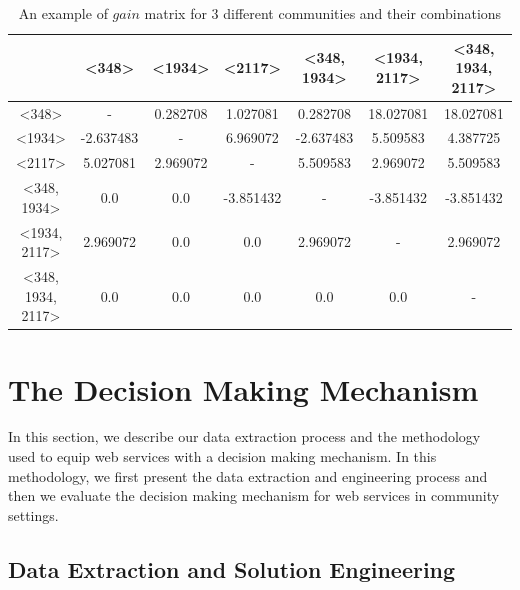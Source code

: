 \documentclass[10pt,journal,cspaper,compsoc]{IEEEtran}
\begin{document}
\begin{table}[ht]
\caption{An example of $gain$ matrix for 3 different communities and their combinations} %
\centering %
{\renewcommand{\arraystretch}{1.2}
\begin{tabular}{c|c c c c c c} %
\hline\hline %
 & \textless348\textgreater & \textless1934\textgreater & \textless2117\textgreater & \textless348, 1934\textgreater & \textless1934, 2117\textgreater & \textless348, 1934, 2117\textgreater \\ [0.5ex] %
\hline %
\textless348\textgreater & - & 0.282708 & 1.027081 & 0.282708 & 18.027081 & 18.027081 \\
\textless1934\textgreater & -2.637483 & - & 6.969072 & -2.637483 & 5.509583 & 4.387725 \\
\textless2117\textgreater & 5.027081 & 2.969072 & - & 5.509583 & 2.969072 & 5.509583 \\
\textless348, 1934\textgreater & 0.0 & 0.0 & -3.851432 & - & -3.851432 & -3.851432 \\
\textless1934, 2117\textgreater & 2.969072 & 0.0 & 0.0 & 2.969072 & - & 2.969072 \\
\textless348, 1934, 2117\textgreater & 0.0 & 0.0 & 0.0 & 0.0 & 0.0 & - \\ [1ex] %
\hline %
\end{tabular}
}
\label{table:nonlin} %
\end{table}

\section{The Decision Making Mechanism}\label{s:model}

In this section, we describe our data extraction process and the methodology used to equip web services with a decision making mechanism. In this methodology, we first present the data extraction and engineering process and then we evaluate the decision making mechanism for web services in community settings.

\subsection{Data Extraction and Solution Engineering}\label{ss:learningdata}
\end{document}
